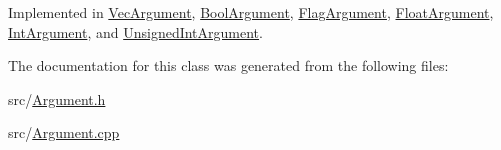 Implemented in \hyperlink{classVecArgument_a2b3cbbc68d03d2eec8dd00452d228ef1}{Vec\-Argument}, \hyperlink{classBoolArgument_ad4c0bd190cf554294e07d4ad3194308e}{Bool\-Argument}, \hyperlink{classFlagArgument_a881f9de4811858463a4a981d3ebedb79}{Flag\-Argument}, \hyperlink{classFloatArgument_a6456a6760c3030a7c67c688e8cde03be}{Float\-Argument}, \hyperlink{classIntArgument_a3d27054173466542694fd971b13be8bb}{Int\-Argument}, and \hyperlink{classUnsignedIntArgument_a46d930be372e3443fc3f3a2419ceb387}{Unsigned\-Int\-Argument}.



The documentation for this class was generated from the following files\-:\begin{DoxyCompactItemize}
\item 
src/\hyperlink{Argument_8h}{Argument.\-h}\item 
src/\hyperlink{Argument_8cpp}{Argument.\-cpp}\end{DoxyCompactItemize}
